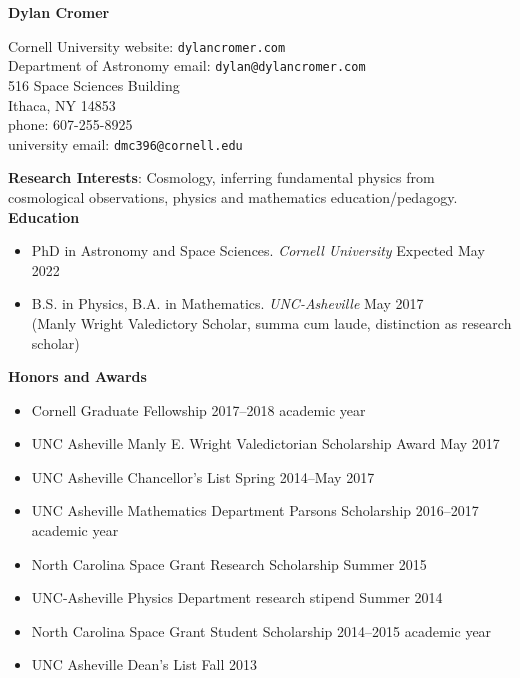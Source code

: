 \documentclass[letterpaper, 11pt]{article}
\title{}
\author{}
\date{Last Edited: \today}
\newcommand{\myrule}{\hrulefill}
\newcommand{\noi}{\noindent}
\begin{document}
\begin{center}
\textbf{Dylan Cromer} 
\\
\vspace{1.3em}
\myrule
\end{center}

\noi Cornell University \hfill website: \texttt{dylancromer.com}
\\
Department of Astronomy \hfill email: \texttt{dylan@dylancromer.com}
\\
516 Space Sciences Building \hfill
\\
Ithaca, NY 14853 \hfill
\\
phone: 607-255-8925 \hfill
\\
university email: \texttt{dmc396@cornell.edu} \hfill
\\

\fancyfoot{\myrule \\ Dylan Cromer \hfill \thepage}

\noi \textbf{Research Interests}: Cosmology, inferring fundamental physics from cosmological observations, physics and mathematics education/pedagogy.
\\

\noi \textbf{Education}
\begin{itemize}[leftmargin=*]

	\item PhD in Astronomy and Space Sciences. \emph{Cornell University} \hfill Expected May 2022
	
	\item \noi B.S. in Physics, B.A. in Mathematics. \emph{UNC-Asheville} \hfill May 2017
		\\
	(Manly Wright Valedictory Scholar, summa cum laude, distinction as research scholar)

\end{itemize}

\noi \textbf{Honors and Awards}
\begin{itemize}[leftmargin=*]
	\item Cornell Graduate Fellowship \hfill 2017--2018 academic year

	\item UNC Asheville Manly E. Wright Valedictorian Scholarship Award \hfill May 2017

	\item UNC Asheville Chancellor's List \hfill Spring 2014--May 2017

	\item UNC Asheville Mathematics Department Parsons Scholarship \hfill 2016--2017 academic year

	\item North Carolina Space Grant Research Scholarship \hfill Summer 2015 

	\item UNC-Asheville Physics Department research stipend \hfill Summer 2014

	\item North Carolina Space Grant Student Scholarship \hfill 2014--2015 academic year

	\item UNC Asheville Dean's List \hfill Fall 2013

\end{itemize}
\end{document}
